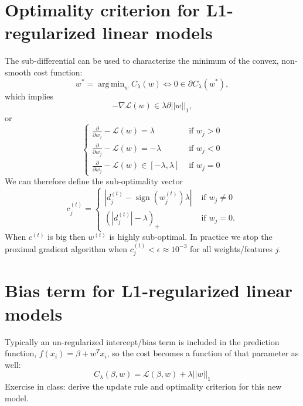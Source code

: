 \documentclass{article}
\DeclareMathOperator*{\sign}{sign}
\DeclareMathOperator*{\argmin}{arg\,min}
\begin{document}
\section{Optimality criterion for L1-regularized linear models}

The sub-differential can be used to characterize the minimum of
the convex, non-smooth cost function:
\begin{equation}
  w^* = \argmin_w C_\lambda(w) \iff 0\in \partial C_\lambda(w^*),
\end{equation}
which implies
\begin{equation}
  -\nabla \mathcal L(w) \in \lambda \partial ||w||_1,
\end{equation}
or
\begin{equation}
  \begin{cases}
    \frac{\partial}{\partial w_j} -\mathcal L(w) = \lambda & \text{ if } w_j>0\\
    \frac{\partial}{\partial w_j} -\mathcal L(w) = -\lambda & \text{ if } w_j<0\\
    \frac{\partial}{\partial w_j} -\mathcal L(w) \in [-\lambda,\lambda] & \text{ if } w_j=0
  \end{cases}
\end{equation}
We can therefore define the sub-optimality vector
\begin{equation}
  \label{eq:c_j}
  c_j^{(t)} =
  \begin{cases}
    |d_j^{(t)} - \sign(w_j^{(t)})\lambda| & \text{ if } w_j\neq 0\\
    (|d_j^{(t)}| - \lambda)_+ & \text{ if } w_j = 0.
  \end{cases}
\end{equation}
When $c^{(t)}$ is big then $w^{(t)}$ is highly sub-optimal. In
practice we stop the proximal gradient algorithm when
$c_j^{(t)}<\epsilon\approx 10^{-3}$ for all weights/features $j$.

\section{Bias term for L1-regularized linear models}

Typically an un-regularized intercept/bias term is included in the
prediction function, $f(x_i)= \beta + w^T x_i$, so the cost becomes a
function of that parameter as well:
\begin{equation}
  C_{\lambda}(\beta, w) = \mathcal L(\beta, w) + \lambda ||w||_1
\end{equation}
Exercise in class: derive the update rule and optimality criterion for
this new model.




\end{document}
